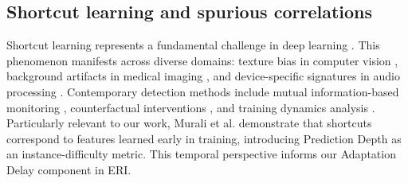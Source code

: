 \documentclass[conference]{IEEEtran}
\begin{document}
\subsection{Shortcut learning and spurious correlations}
Shortcut learning represents a fundamental challenge in deep learning \cite{Steinmann2024navigating}. This phenomenon manifests across diverse domains: texture bias in computer vision \cite{Geirhos_2020}, background artifacts in medical imaging \cite{Hill2024TheRO,Bassi2024improving}, and device-specific signatures in audio processing \cite{shim2023constructperfectworsethancoinflipspoofing}. Contemporary detection methods include mutual information-based monitoring \cite{Adnan2022MonitoringSL,Fay2023AvoidingSB}, counterfactual interventions \cite{Robinson2022DeepLM}, and training dynamics analysis \cite{murali2023distributionshiftspuriousfeatures}. Particularly relevant to our work, Murali et al. \cite{murali2023distributionshiftspuriousfeatures} demonstrate that shortcuts correspond to features learned early in training, introducing Prediction Depth as an instance-difficulty metric. This temporal perspective informs our Adaptation Delay component in ERI. 
\end{document}
